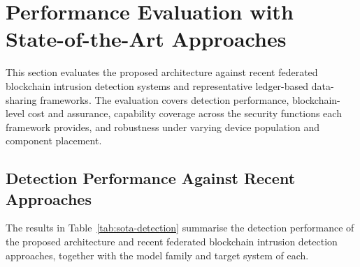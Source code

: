 \section{Performance Evaluation with State-of-the-Art Approaches}
\label{sec:eval-sota}
This section evaluates the proposed architecture against recent federated blockchain intrusion detection systems and representative ledger-based data-sharing frameworks. The evaluation covers detection performance, blockchain-level cost and assurance, capability coverage across the security functions each framework provides, and robustness under varying device population and component placement.
 
\subsection{Detection Performance Against Recent Approaches}
\label{sec:sota-detection}
The results in Table~\ref{tab:sota-detection} summarise the detection performance of the proposed architecture and recent federated blockchain intrusion detection approaches, together with the model family and target system of each.
 
